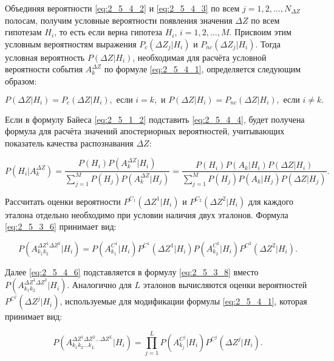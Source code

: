 Объединяя вероятности \eqref{eq:2_5_4_2} и \eqref{eq:2_5_4_3} по всем $j = 1, 2, \dots, N_{\Delta Z}$ полосам, получим условные вероятности появления значения $\Delta Z$ по всем гипотезам $H_i$, то есть если верна гипотеза $H_i$, $i = 1, 2, \dots, M$.
Присвоим этим условным вероятностям выражения $P_c(\Delta Z_j|H_i)$ и $P_{nc}(\Delta Z_j|H_i)$.
Тогда условная вероятность $P(\Delta Z|H_i)$, необходимая для расчёта условной вероятности события $A_k^{\Delta Z}$ по формуле \eqref{eq:2_5_4_1}, определяется следующим образом:

\begin{equation}\label{eq:2_5_4_4}
P(\Delta Z|H_i) = P_c(\Delta Z|H_i), \text{ если } i=k, \text{ и } P(\Delta Z|H_i) = P_{nc}(\Delta Z|H_i), \text{ если } i \ne k.
\end{equation}

Если в формулу Байеса \eqref{eq:2_5_1_2} подставить \eqref{eq:2_5_4_4}, будет получена формула для расчёта значений апостериорных вероятностей, учитывающих показатель качества распознавания $\Delta Z$:

\begin{equation}\label{eq:2_5_4_5}
P(H_i|A_k^{\Delta Z}) = \frac{P(H_i) P(A_k^{\Delta Z}|H_i)}{\sum_{j=1}^M P(H_j) P(A_k^{\Delta Z}|H_j)}
= \frac{P(H_i) P(A_k|H_i) P(\Delta Z|H_i)}{\sum_{j=1}^M P(H_j) P(A_k|H_j) P(\Delta Z|H_j)}.
\end{equation}

Рассчитать оценки вероятности $P^{C_1}(\Delta Z^1|H_i)$ и $P^{C_2}(\Delta Z^2|H_i)$ для каждого эталона отдельно необходимо при условии наличия двух эталонов.
Формула \eqref{eq:2_5_3_6} принимает вид:

\begin{equation}\label{eq:2_5_4_6}
P(A_{k_1 k_2}^{\Delta Z^1 \Delta Z^2}|H_i) =
P(A_{k_1}^{C^1}|H_i) P^{C^1}(\Delta Z^1|H_i) P(A_{k_2}^{C^2}|H_i) P^{C^2}(\Delta Z^2|H_i).
\end{equation}

Далее \eqref{eq:2_5_4_6} подставляется в формулу \eqref{eq:2_5_3_8} вместо $P(A_{k_1 k_2}^{\Delta Z^1 \Delta Z^2}|H_i)$.
Аналогично для $L$ эталонов вычисляются оценки вероятностей $P^{C^j}(\Delta Z^j|H_i)$, используемые для модификации формулы \eqref{eq:2_5_4_1}, которая принимает вид:

\begin{equation}\label{eq:2_5_4_7}
P(A_{k_1 k_2 \dots k_L}^{\Delta Z^1 \Delta Z^2 \dots \Delta Z^L}|H_i) =
\prod_{j=1}^{L} P(A_{k_j}^{C^j}|H_i) P^{C^j}(\Delta Z^j|H_i).
\end{equation}

